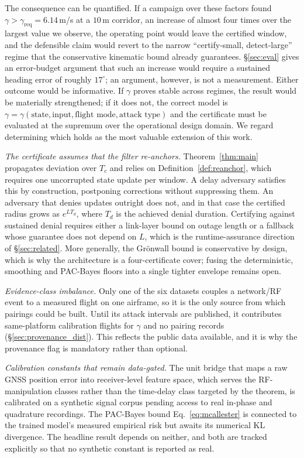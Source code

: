 The consequence can be quantified. If a campaign over these factors found
$\gamma>\gamma_{\mathrm{req}}=6.14$\,m/s at a $10$\,m corridor, an increase of
almost four times over the largest value we observe, the operating point would
leave the certified window, and the defensible claim would revert to the narrow
``certify-small, detect-large'' regime that the conservative kinematic bound
already guarantees. \S\ref{sec:eval} gives an error-budget argument that such an
increase would require a sustained heading error of roughly $17^\circ$; an
argument, however, is not a measurement. Either outcome would be informative. If
$\gamma$ proves stable across regimes, the result would be materially strengthened; if
it does not, the correct model is $\gamma=\gamma(\text{state},\text{input},\text{flight
mode},\text{attack type})$ and the certificate must be evaluated at the
supremum over the operational design domain. We regard determining which holds as
the most valuable extension of this work.

\emph{The certificate assumes that the filter re-anchors.} Theorem~\ref{thm:main}
propagates deviation over $T_c$ and relies on Definition~\ref{def:reanchor},
which requires one uncorrupted state update per window. A delay adversary
satisfies this by construction, postponing corrections without suppressing
them. An adversary that denies updates outright does not, and in
that case the certified radius grows as $e^{LT_d}$, where $T_d$ is the achieved
denial duration. Certifying against sustained denial requires either a link-layer bound
on outage length or a fallback whose guarantee does not depend on $L$, which is
the runtime-assurance direction of \S\ref{sec:related}. More generally, the
Gr\"onwall bound is conservative by design, which is why the architecture is a
four-certificate cover; fusing the deterministic, smoothing and PAC-Bayes floors
into a single tighter envelope remains open.

\emph{Evidence-class imbalance.} Only one of the six datasets couples a
network/RF event to a measured flight on one airframe, so it is the only source
from which  pairings could be built. Until its
attack intervals are published, it contributes same-platform calibration flights
for $\gamma$ and no pairing records (\S\ref{sec:provenance_dist}). This reflects
the public data available, and it is why the provenance flag is mandatory
rather than optional.

\emph{Calibration constants that remain data-gated.} The unit bridge that maps a
raw GNSS position error into receiver-level feature space, which serves the
RF-manipulation classes rather than the time-delay class targeted by the
theorem, is calibrated on a synthetic signal corpus pending access to real
in-phase and quadrature recordings. The PAC-Bayes bound
Eq.~\eqref{eq:mcallester} is connected to the trained model's measured empirical
risk but awaits its numerical KL divergence. The headline result depends
on neither, and both are tracked explicitly so that no synthetic constant is
reported as real.


